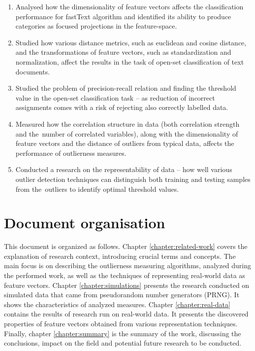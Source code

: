 \begin{enumerate}
    \item Analysed how the dimensionality of feature vectors affects the classification performance for fastText algorithm and identified its ability to produce categories as focused projections in the feature-space.

    \item Studied how various distance metrics, such as euclidean and cosine distance, and the transformations of feature vectors, such as standardization and normalization, affect the results in the task of open-set classification of text documents.

    \item Studied the problem of precision-recall relation and finding the threshold value in the open-set classification task – as reduction of incorrect assignments comes with a risk of rejecting also correctly labelled data.

    \item Measured how the correlation structure in data (both correlation strength and the~number of correlated variables), along with the dimensionality of feature vectors and the distance of outliers from typical data, affects the performance of outlierness measures.

    \item Conducted a research on the representability of data – how well various outlier detection techniques can distinguish both training and testing samples from the~outliers to identify optimal threshold values.
\end{enumerate}


\section{Document organisation}
\label{section:document-organisation}

This document is organized as follows. Chapter \ref{chapter:related-work} covers the explanation of research context, introducing crucial terms and concepts. The main focus is on describing the outlierness measuring algorithms, analyzed during the performed work, as well as the techniques of representing real-world data as feature vectors. Chapter \ref{chapter:simulations} presents the research conducted on simulated data that came from pseudorandom number generators (PRNG). It shows the characteristics of analyzed measures. Chapter \ref{chapter:real-data} contains the results of research run on real-world data. It presents the discovered properties of feature vectors obtained from various representation techniques. Finally, chapter \ref{chapter:summary} is the summary of the work, discussing the conclusions, impact on the field and potential future research to be conducted.
